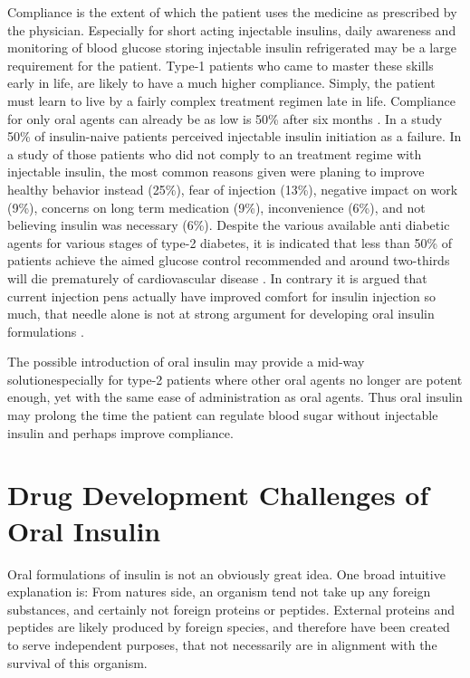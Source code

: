 Compliance is the extent of which the patient uses the medicine as prescribed by the physician. Especially for short acting injectable insulins, daily awareness and monitoring of blood glucose \DIFdelbegin {}\DIFdelend \DIFaddbegin {}\DIFaddend storing injectable insulin refrigerated may be a large requirement for the patient. Type-1 patients who came to master these skills early in life, are likely to have a much higher compliance. Simply, the patient must learn to live by a fairly complex treatment regimen late in life. Compliance for only oral agents can already be as low is 50\% after six months \cite{garcia2013adherence}. In a study 50\% of insulin-naive patients perceived injectable insulin initiation as a failure. In a study \DIFdelbegin \DIFdel{, }\DIFdelend of those patients who did not comply to an treatment regime with injectable insulin, the most common reasons given were planing to improve healthy behavior instead (25\%), fear of injection (13\%), negative impact on work (9\%), concerns on long term medication (9\%), inconvenience (6\%), and not believing insulin was necessary (6\%). Despite the various available anti diabetic agents for various stages of type-2 diabetes, it is indicated that less than 50\% of patients achieve the aimed glucose control recommended and around two-thirds will die prematurely of cardiovascular disease \cite{garcia2013adherence}. In contrary it is argued that current injection pens actually have improved comfort for insulin injection so much, that needle \DIFdelbegin {}\DIFdelend \DIFaddbegin {}\DIFaddend alone is not at strong argument for developing oral insulin formulations \cite{maher2014formulation}.

The possible introduction of oral insulin may provide a mid-way solution\DIFaddbegin \DIFadd{, }\DIFaddend especially for type-2 patients where other oral agents no longer are potent enough, yet with the same ease of administration as oral agents. Thus oral insulin may prolong the time the patient can regulate blood sugar without injectable insulin and perhaps improve compliance.

\section{Drug Development Challenges of Oral Insulin}
Oral formulations of insulin is not an obviously great idea. One broad intuitive explanation is: From natures side, an organism tend not take up any foreign substances, and certainly not foreign proteins or peptides. External proteins and peptides are likely produced by foreign species, and therefore have been created to serve independent purposes, that not necessarily are in alignment with the survival of this organism.

